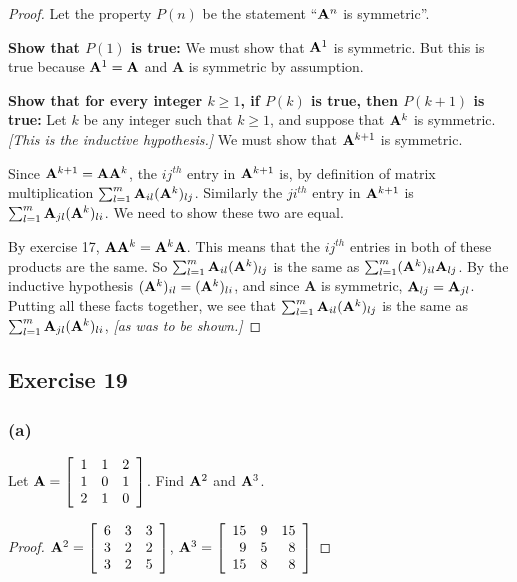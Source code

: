 \documentclass[14pt]{extarticle}
\begin{document}
\begin{proof}
Let the property \(P(n)\) be the statement ``\({\bf A}^n\) is symmetric''.

{\bf Show that \(P(1)\) is true:} We must show that \({\bf A}^1\) is symmetric. But this is true because 
\({\bf A}^1 = {\bf A}\) and {\bf A} is symmetric by assumption.

{\bf Show that for every integer \(k \geq 1\), if \(P(k)\) is true, then \(P(k + 1)\) is true:} Let \(k\) be any integer 
such that \(k \geq 1\), and suppose that \({\bf A}^k\) is symmetric. {\it [This is the inductive hypothesis.]} 
We must show that \({\bf A}^{k+1}\) is symmetric. 

Since \({\bf A}^{k+1} = {\bf A}{\bf A}^k\), the \(ij^{th}\) entry in \({\bf A}^{k+1}\) is, by definition of matrix 
multiplication \(\sum_{l=1}^m {\bf A}_{il} ({\bf A}^k)_{lj}\). Similarly the \(ji^{th}\) entry in \({\bf A}^{k+1}\) is
\(\sum_{l=1}^m {\bf A}_{jl} ({\bf A}^k)_{li}\). We need to show these two are equal.

By exercise 17, \({\bf A}{\bf A}^k = {\bf A}^k{\bf A}\). This means that the \(ij^{th}\) entries in both of these products 
are the same. So \(\sum_{l=1}^m{\bf A}_{il} ({\bf A}^k)_{lj}\) is the same as \(\sum_{l=1}^m ({\bf A}^k)_{il}{\bf A}_{lj}\).
By the inductive hypothesis \(({\bf A}^k)_{il} = ({\bf A}^k)_{li}\), and since {\bf A} is symmetric, \({\bf A}_{lj} = 
{\bf A}_{jl}\). Putting all these facts together, we see that \(\sum_{l=1}^m {\bf A}_{il} ({\bf A}^k)_{lj}\) is the same as
\(\sum_{l=1}^m {\bf A}_{jl} ({\bf A}^k)_{li}\), {\it [as was to be shown.]}
\end{proof}

\subsection{Exercise 19}
\subsubsection{(a)}
Let \({\bf A} = 
\left[ 
\begin{array}{rrr}
1 & 1 & 2 \\
1 & 0 & 1\\
2 & 1 & 0 \\
\end{array}
\right]
\). Find \({\bf A}^2\) and \({\bf A}^3\).

\begin{proof}
\({\bf A}^2 = 
\left[ 
\begin{array}{rrr}
6 & 3 & 3 \\
3 & 2 & 2 \\
3 & 2 & 5 \\
\end{array}
\right]
\), 
\({\bf A}^3 = 
\left[ 
\begin{array}{rrr}
15 & 9 & 15 \\
9 & 5 & 8 \\
15 & 8 & 8 \\
\end{array}
\right]
\)
\end{proof}
\end{document}
